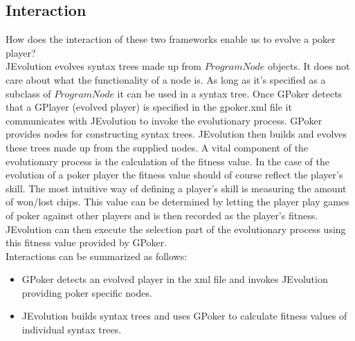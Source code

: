 \subsection{Interaction}
How does the interaction of these two frameworks enable us to evolve a poker player?  \\
JEvolution evolves syntax trees made up from $ProgramNode$ objects. It does not care about what the functionality of a node is. As long
as it's specified as a subclass of $ProgramNode$ it can be used in a syntax tree.
Once GPoker detects that a GPlayer (evolved player) is specified in the gpoker.xml file it communicates with JEvolution to invoke the evolutionary process.  GPoker provides nodes 
for constructing syntax trees. JEvolution then builds and evolves these trees made up from the supplied nodes. A vital component of the evolutionary process is the calculation of the fitness value. In the case
of the evolution of a poker player the fitness value should of course reflect the player's skill. The most intuitive way of defining a player's skill is measuring the amount of won/lost chips.
This value can be determined by letting the player play games of poker against other players and is then recorded as the player's fitness. JEvolution can then execute the selection part
of the evolutionary process using this fitness value provided by GPoker.
\\
Interactions can be summarized as follows:
\begin{itemize}
	\item GPoker detects an evolved player in the xml file and invokes JEvolution providing poker specific nodes.
	\item JEvolution builds syntax trees and uses GPoker to calculate fitness values of individual syntax trees.
\end{itemize}